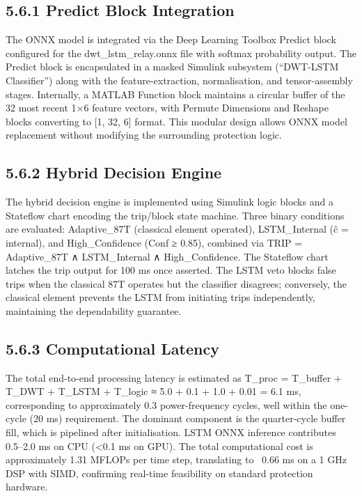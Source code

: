 \subsection{5.6.1  Predict Block Integration}
The ONNX model is integrated via the Deep Learning Toolbox Predict block configured for the dwt\_lstm\_relay.onnx file with softmax probability output. The Predict block is encapsulated in a masked Simulink subsystem (``DWT-LSTM Classifier'') along with the feature-extraction, normalisation, and tensor-assembly stages. Internally, a MATLAB Function block maintains a circular buffer of the 32 most recent 1×6 feature vectors, with Permute Dimensions and Reshape blocks converting to [1, 32, 6] format. This modular design allows ONNX model replacement without modifying the surrounding protection logic.


\subsection{5.6.2  Hybrid Decision Engine}
The hybrid decision engine is implemented using Simulink logic blocks and a Stateflow chart encoding the trip/block state machine. Three binary conditions are evaluated: Adaptive\_87T (classical element operated), LSTM\_Internal (ĉ = internal), and High\_Confidence (Conf ≥ 0.85), combined via TRIP = Adaptive\_87T ∧ LSTM\_Internal ∧ High\_Confidence. The Stateflow chart latches the trip output for 100 ms once asserted. The LSTM veto blocks false trips when the classical 87T operates but the classifier disagrees; conversely, the classical element prevents the LSTM from initiating trips independently, maintaining the dependability guarantee.


\subsection{5.6.3  Computational Latency}
The total end-to-end processing latency is estimated as T\_proc = T\_buffer + T\_DWT + T\_LSTM + T\_logic ≈ 5.0 + 0.1 + 1.0 + 0.01 = 6.1 ms, corresponding to approximately 0.3 power-frequency cycles, well within the one-cycle (20 ms) requirement. The dominant component is the quarter-cycle buffer fill, which is pipelined after initialisation. LSTM ONNX inference contributes 0.5--2.0 ms on CPU (<0.1 ms on GPU). The total computational cost is approximately 1.31 MFLOPs per time step, translating to ~0.66 ms on a 1 GHz DSP with SIMD, confirming real-time feasibility on standard protection hardware.


